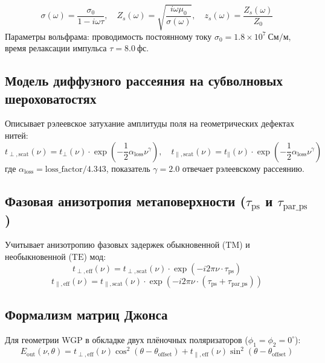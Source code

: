 \documentclass[12pt,a4paper]{article}
\begin{document}
\begin{equation}
\sigma(\omega) = \frac{\sigma_0}{1 - i \omega \tau}, \quad Z_s(\omega) = \sqrt{\frac{i \omega \mu_0}{\sigma(\omega)}}, \quad z_s(\omega) = \frac{Z_s(\omega)}{Z_0}
\end{equation}
Параметры вольфрама: проводимость постоянному току $\sigma_0 = 1.8 \times 10^7\ \text{См/м}$, время релаксации импульса $\tau = 8.0\ \text{фс}$.

\subsection{Модель диффузного рассеяния на субволновых шероховатостях}
Описывает рэлеевское затухание амплитуды поля на геометрических дефектах нитей:
\begin{equation}
t_{\perp,\text{scat}}(\nu) = t_{\perp}(\nu) \cdot \exp\left(-\frac{1}{2} \alpha_{\text{loss}} \nu^\gamma\right), \quad t_{\parallel,\text{scat}}(\nu) = t_{\parallel}(\nu) \cdot \exp\left(-\frac{1}{2} \alpha_{\text{loss}} \nu^\gamma\right)
\end{equation}
где $\alpha_{\text{loss}} = \text{loss\_factor} / 4.343$, показатель $\gamma = 2.0$ отвечает рэлеевскому рассеянию.

\subsection{Фазовая анизотропия метаповерхности ($\tau_{\text{ps}}$ и $\tau_{\text{par\_ps}}$)}
Учитывает анизотропию фазовых задержек обыкновенной ($\text{TM}$) и необыкновенной ($\text{TE}$) мод:
\begin{equation}
t_{\perp,\text{eff}}(\nu) = t_{\perp,\text{scat}}(\nu) \cdot \exp\left(-i 2\pi \nu \cdot \tau_{\text{ps}}\right)
\end{equation}
\begin{equation}
t_{\parallel,\text{eff}}(\nu) = t_{\parallel,\text{scat}}(\nu) \cdot \exp\left(-i 2\pi \nu \cdot (\tau_{\text{ps}} + \tau_{\text{par\_ps}})\right)
\end{equation}

\subsection{Формализм матриц Джонса}
Для геометрии WGP в обкладке двух плёночных поляризаторов ($\phi_1 = \phi_2 = 0^\circ$):
\begin{equation}
E_{\text{out}}(\nu, \theta) = t_{\perp,\text{eff}}(\nu) \cos^2(\theta - \theta_{\text{offset}}) + t_{\parallel,\text{eff}}(\nu) \sin^2(\theta - \theta_{\text{offset}})
\end{equation}
\end{document}
